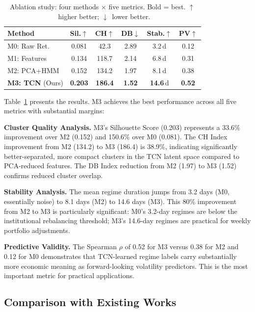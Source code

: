 \begin{table}[t]
\centering
\caption{Ablation study: four methods × five metrics. Bold = best. $\uparrow$~higher better; $\downarrow$~lower better.}
\label{tab:ablation}
\begin{tabular}{@{}lccccc@{}}
\toprule
\textbf{Method} & \textbf{Sil.}$\uparrow$ & \textbf{CH}$\uparrow$ & \textbf{DB}$\downarrow$ & \textbf{Stab.}$\uparrow$ & \textbf{PV}$\uparrow$ \\
\midrule
M0: Raw Ret.      & 0.081  & 42.3   & 2.89  & 3.2\,d  & 0.12 \\
M1: Features      & 0.134  & 118.7  & 2.14  & 6.8\,d  & 0.31 \\
M2: PCA+HMM       & 0.152  & 134.2  & 1.97  & 8.1\,d  & 0.38 \\
\textbf{M3: TCN} (Ours) & \textbf{0.203} & \textbf{186.4} & \textbf{1.52} & \textbf{14.6}\,d & \textbf{0.52} \\
\bottomrule
\end{tabular}
\end{table}

Table~\ref{tab:ablation} presents the results. M3 achieves the best performance across all five metrics with substantial margins:

\textbf{Cluster Quality Analysis.} M3's Silhouette Score (0.203) represents a 33.6\% improvement over M2 (0.152) and 150.6\% over M0 (0.081). The CH Index improvement from M2 (134.2) to M3 (186.4) is 38.9\%, indicating significantly better-separated, more compact clusters in the TCN latent space compared to PCA-reduced features. The DB Index reduction from M2 (1.97) to M3 (1.52) confirms reduced cluster overlap.

\textbf{Stability Analysis.} The mean regime duration jumps from 3.2 days (M0, essentially noise) to 8.1 days (M2) to 14.6 days (M3). This 80\% improvement from M2 to M3 is particularly significant: M0's 3.2-day regimes are below the institutional rebalancing threshold; M3's 14.6-day regimes are practical for weekly portfolio adjustments.

\textbf{Predictive Validity.} The Spearman $\rho$ of 0.52 for M3 versus 0.38 for M2 and 0.12 for M0 demonstrates that TCN-learned regime labels carry substantially more economic meaning as forward-looking volatility predictors. This is the most important metric for practical applications.

\subsection{Comparison with Existing Works}


